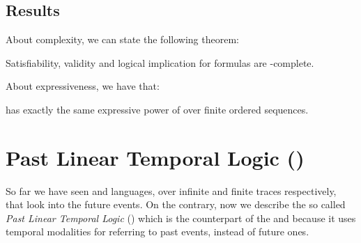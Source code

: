 \subsection{Results}
About \LTLf complexity, we can state the following theorem:
\begin{theorem}\citep{de2013linear}
Satisfiability, validity and logical implication for \LTLf formulas are \PSPACE-complete.
\end{theorem}
\noindent About \LTLf expressiveness, we have that:
\begin{theorem}\citep{de2013linear,Gabbay:1997:TAF:903586}
\LTLf has exactly the same expressive power of \FOL over finite ordered sequences.
\end{theorem}
\section{Past Linear Temporal Logic (\PLTL)}
So far we have seen \LTL and \LTLf languages, over infinite and finite traces respectively, that look into the future events. On the contrary, now we describe the so called \textit{Past Linear Temporal Logic} (\PLTL) which is the counterpart of the \LTL and \LTLf because it uses temporal modalities for referring to past events, instead of future ones.
